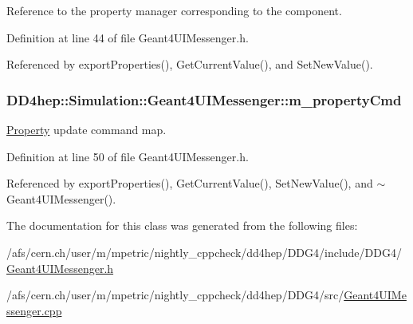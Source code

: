 Reference to the property manager corresponding to the component. 

Definition at line 44 of file Geant4UIMessenger.h.

Referenced by exportProperties(), GetCurrentValue(), and SetNewValue().\hypertarget{class_d_d4hep_1_1_simulation_1_1_geant4_u_i_messenger_a79be5ed431c95728e21ba8119138dff0}{
\subsubsection[{m\_\-propertyCmd}]{ {\bf DD4hep::Simulation::Geant4UIMessenger::m\_\-propertyCmd}}}
\label{class_d_d4hep_1_1_simulation_1_1_geant4_u_i_messenger_a79be5ed431c95728e21ba8119138dff0}


\hyperlink{class_d_d4hep_1_1_property}{Property} update command map. 

Definition at line 50 of file Geant4UIMessenger.h.

Referenced by exportProperties(), GetCurrentValue(), SetNewValue(), and $\sim$Geant4UIMessenger().

The documentation for this class was generated from the following files:\begin{DoxyCompactItemize}
\item 
/afs/cern.ch/user/m/mpetric/nightly\_\-cppcheck/dd4hep/DDG4/include/DDG4/\hyperlink{_geant4_u_i_messenger_8h}{Geant4UIMessenger.h}\item 
/afs/cern.ch/user/m/mpetric/nightly\_\-cppcheck/dd4hep/DDG4/src/\hyperlink{_geant4_u_i_messenger_8cpp}{Geant4UIMessenger.cpp}\end{DoxyCompactItemize}
